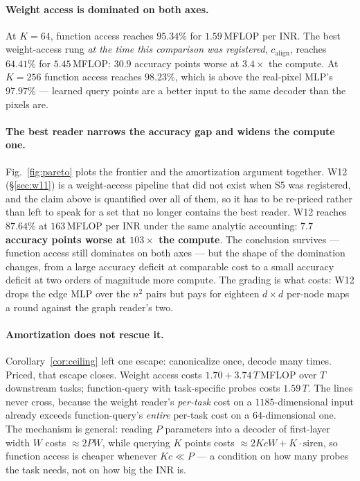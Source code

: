 \documentclass[10pt,letterpaper]{article}
\theoremstyle{definition}
\newcommand{\calign}{c_{\mathrm{align}}}
\begin{document}
\paragraph{Weight access is dominated on both axes.} At $K = 64$, function access reaches
$95.34\%$ for $1.59$\,MFLOP per INR. The best weight-access rung \emph{at the time this comparison
was registered}, $\calign$, reaches $64.41\%$ for $5.45$\,MFLOP: $30.9$ accuracy points worse at
$3.4\times$ the compute. At $K = 256$ function access reaches $98.23\%$, which is above the
real-pixel MLP's $97.97\%$ --- learned query points are a better input to the same decoder than the
pixels are.

\paragraph{The best reader narrows the accuracy gap and widens the compute one.}
Fig.~\ref{fig:pareto} plots the frontier and the amortization argument together. W12
(\S\ref{sec:w11}) is a weight-access pipeline that did not exist when S5 was registered, and the
claim above is quantified over all of them, so it has to be re-priced rather than left to speak for
a set that no longer contains the best reader. W12 reaches $87.64\%$ at $163$\,MFLOP per INR under
the same analytic accounting: \textbf{$7.7$ accuracy points worse at $103\times$ the compute}. The
conclusion survives --- function access still dominates on both axes --- but the shape of the
domination changes, from a large accuracy deficit at comparable cost to a small accuracy deficit at
two orders of magnitude more compute. The grading is what costs: W12 drops the edge MLP over the
$n^2$ pairs but pays for eighteen $d\times d$ per-node maps a round against the graph reader's two.

\paragraph{Amortization does not rescue it.} Corollary~\ref{cor:ceiling} left one escape: canonicalize
once, decode many times. Priced, that escape closes. Weight access costs
$1.70 + 3.74\,T$\,MFLOP over $T$ downstream tasks; function-query with task-specific probes costs
$1.59\,T$. The lines never cross, because the weight reader's \emph{per-task} cost on a $1185$-dimensional
input already exceeds function-query's \emph{entire} per-task cost on a $64$-dimensional one. The
mechanism is general: reading $P$ parameters into a decoder of first-layer width $W$ costs
$\approx 2PW$, while querying $K$ points costs $\approx 2KcW + K\cdot\mathrm{siren}$, so function
access is cheaper whenever $Kc \ll P$ --- a condition on how many probes the task needs, not on how
big the INR is.
\end{document}
